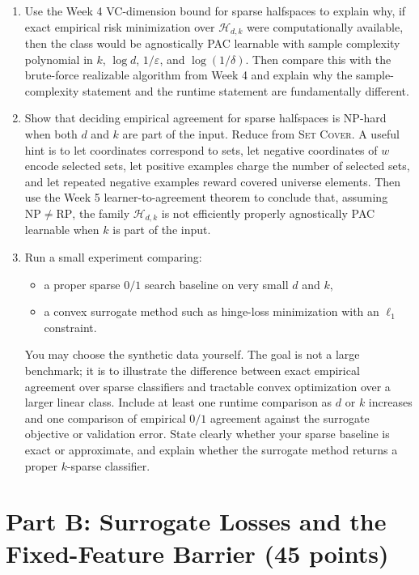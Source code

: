 \documentclass{article}
\begin{document}
\begin{enumerate}
\item Use the Week 4 VC-dimension bound for sparse halfspaces to explain why, if exact empirical risk minimization over $\mathcal{H}_{d,k}$ were computationally available, then the class would be agnostically PAC learnable with sample complexity polynomial in $k$, $\log d$, $1/\varepsilon$, and $\log(1/\delta)$. Then compare this with the brute-force realizable algorithm from Week 4 and explain why the sample-complexity statement and the runtime statement are fundamentally different.

\item Show that deciding empirical agreement for sparse halfspaces is NP-hard when both $d$ and $k$ are part of the input. Reduce from \textsc{Set Cover}. A useful hint is to let coordinates correspond to sets, let negative coordinates of $w$ encode selected sets, let positive examples charge the number of selected sets, and let repeated negative examples reward covered universe elements. Then use the Week 5 learner-to-agreement theorem to conclude that, assuming $\mathrm{NP}\neq\mathrm{RP}$, the family $\mathcal{H}_{d,k}$ is not efficiently properly agnostically PAC learnable when $k$ is part of the input.

\item Run a small experiment comparing:
\begin{itemize}
\item a proper sparse $0/1$ search baseline on very small $d$ and $k$,
\item a convex surrogate method such as hinge-loss minimization with an $\ell_1$ constraint.
\end{itemize}
You may choose the synthetic data yourself. The goal is not a large benchmark; it is to illustrate the difference between exact empirical agreement over sparse classifiers and tractable convex optimization over a larger linear class. Include at least one runtime comparison as $d$ or $k$ increases and one comparison of empirical $0/1$ agreement against the surrogate objective or validation error. State clearly whether your sparse baseline is exact or approximate, and explain whether the surrogate method returns a proper $k$-sparse classifier.
\end{enumerate}

\section{Part B: Surrogate Losses and the Fixed-Feature Barrier (45 points)}
\end{document}

